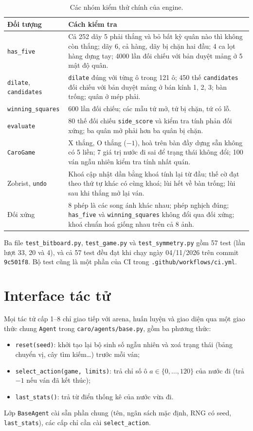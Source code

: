 \begin{table}[H]
  \centering\small
  \caption{Các nhóm kiểm thử chính của engine.}
  \label{tab:kiem-thu}
  \begin{tabularx}{\textwidth}{@{}lX@{}}
    \toprule
    \textbf{Đối tượng} & \textbf{Cách kiểm tra} \\
    \midrule
    \texttt{has\_five} & Cả 252 dãy 5 phải thắng và bỏ bất kỳ quân nào thì không còn thắng; dãy 6, cả hàng, dãy bị chặn hai đầu; 4 ca lọt hàng dựng tay; \num{4000} lần đối chiếu với bản duyệt mảng ở 5 mật độ quân. \\
    \texttt{dilate}, \texttt{candidates} & \texttt{dilate} đúng với từng ô trong 121 ô; 450 thế \texttt{candidates} đối chiếu với bản duyệt mảng ở bán kính 1, 2, 3; bàn trống; quân ở mép phải. \\
    \texttt{winning\_squares} & 600 lần đối chiếu; các mẫu tứ mở, tứ bị chặn, tứ có lỗ. \\
    \texttt{evaluate} & 80 thế đối chiếu \texttt{side\_score} và kiểm tra tính phản đối xứng; ba quân mở phải hơn ba quân bị chặn. \\
    \texttt{CaroGame} & X thắng, O thắng ($-1$), hoà trên bàn đầy dựng sẵn không có 5 liền; 7 giá trị nước đi sai để trạng thái không đổi; 100 ván ngẫu nhiên kiểm tra tính nhất quán. \\
    Zobrist, \texttt{undo} & Khoá cập nhật dần bằng khoá tính lại từ đầu; thế cờ đạt theo thứ tự khác có cùng khoá; lùi hết về bàn trống; lùi sau khi thắng mở lại ván. \\
    Đối xứng & 8 phép là các song ánh khác nhau; phép nghịch đúng; \texttt{has\_five} và \texttt{winning\_squares} không đổi qua đối xứng; khoá chuẩn hoá giống nhau trên cả 8 ảnh. \\
    \bottomrule
  \end{tabularx}
\end{table}

Ba file \texttt{test\_bitboard.py}, \texttt{test\_game.py} và \texttt{test\_symmetry.py} gồm 57 test (lần lượt 33, 20 và 4), và cả 57 test đều đạt khi chạy ngày 04/11/2026 trên commit \texttt{9c501f8}. Bộ test cũng là một phần của CI trong \texttt{.github/workflows/ci.yml}.

\section{Interface tác tử}
Mọi tác tử cấp 1--8 chỉ giao tiếp với arena, huấn luyện và giao diện qua một giao thức chung \texttt{Agent} trong \texttt{caro/agents/base.py}, gồm ba phương thức:
\begin{itemize}
  \item \texttt{reset(seed)}: khởi tạo lại bộ sinh số ngẫu nhiên và xoá trạng thái (bảng chuyển vị, cây tìm kiếm\ldots) trước mỗi ván;
  \item \texttt{select\_action(game, limits)}: trả chỉ số ô $a \in \{0,\dots,120\}$ của nước đi (trả $-1$ nếu ván đã kết thúc);
  \item \texttt{last\_stats()}: trả từ điển thống kê của nước vừa đi.
\end{itemize}
Lớp \texttt{BaseAgent} cài sẵn phần chung (tên, ngân sách mặc định, RNG có seed, \texttt{last\_stats}), các cấp chỉ cần cài \texttt{select\_action}.

